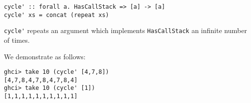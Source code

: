 \documentclass{article}
\begin{document}
\begin{itemize}
\begin{verbatim}
cycle' :: forall a. HasCallStack => [a] -> [a]
cycle' xs = concat (repeat xs)
        \end{verbatim}
        \verb|cycle'| repeats an argument which implements \verb|HasCallStack| an
        infinite number of times.\par
        \qquad We demonstrate as follows:
        \begin{verbatim}
ghci> take 10 (cycle' [4,7,8])
[4,7,8,4,7,8,4,7,8,4]
ghci> take 10 (cycle' [1])
[1,1,1,1,1,1,1,1,1,1]
        \end{verbatim}
    \end{itemize}
\end{document}

